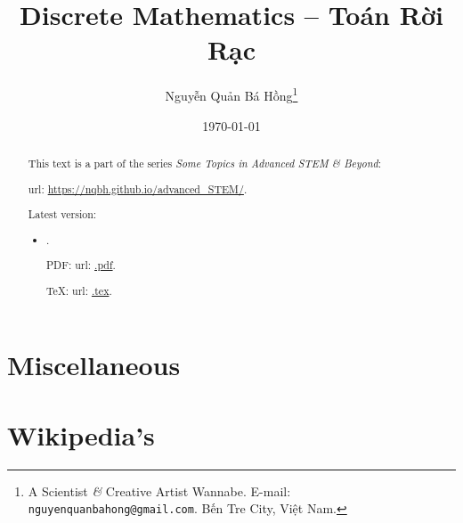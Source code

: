 \documentclass{article}
\title{Discrete Mathematics -- Toán Rời Rạc}
\author{Nguyễn Quản Bá Hồng\footnote{A Scientist {\it\&} Creative Artist Wannabe. E-mail: {\tt nguyenquanbahong@gmail.com}. Bến Tre City, Việt Nam.}}
\date{\today}
\begin{document}
\maketitle
\begin{abstract}
	This text is a part of the series {\it Some Topics in Advanced STEM \& Beyond}:
	
	{\sc url}: \url{https://nqbh.github.io/advanced_STEM/}.
	
	Latest version:
	\begin{itemize}
		\item {\it }.
		
		PDF: {\sc url}: \url{.pdf}.
		
		\TeX: {\sc url}: \url{.tex}.
	\end{itemize}
\end{abstract}
\tableofcontents


\section{}


\section{Miscellaneous}


\section{Wikipedia's}
\end{document}
